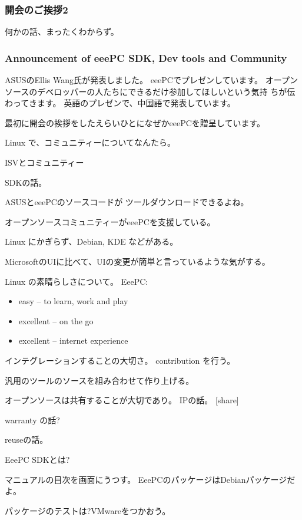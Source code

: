 \documentclass[mingoth,a4paper]{jsarticle}
\begin{document}
\subsubsection{開会のご挨拶2}

何かの話、まったくわからず。

\subsubsection{Announcement of eeePC SDK, Dev tools and Community}

ASUSのEllis Wang氏が発表しました。
eeePCでプレゼンしています。
オープンソースのデベロッパーの人たちにできるだけ参加してほしいという気持
ちが伝わってきます。
英語のプレゼンで、中国語で発表しています。

最初に開会の挨拶をしたえらいひとになぜかeeePCを贈呈しています。

Linux で、コミュニティーについてなんたら。

ISVとコミュニティー

SDKの話。

ASUSとeeePCのソースコードが
ツールダウンロードできるよね。

オープンソースコミュニティーがeeePCを支援している。

Linux にかぎらず、Debian, KDE などがある。

MicrosoftのUIに比べて、UIの変更が簡単と言っているような気がする。

Linux の素晴らしさについて。
EeePC:

\begin{itemize}
 \item easy -- to learn, work and play
 \item excellent -- on the go
 \item excellent -- internet experience
\end{itemize}

インテグレーションすることの大切さ。
contribution を行う。

汎用のツールのソースを組み合わせて作り上げる。

オープンソースは共有することが大切であり。
IPの話。
[share]

warranty の話?

reuseの話。


EeePC SDKとは?

マニュアルの目次を画面にうつす。
EeePCのパッケージはDebianパッケージだよ。

パッケージのテストは?VMwareをつかおう。
\end{document}
